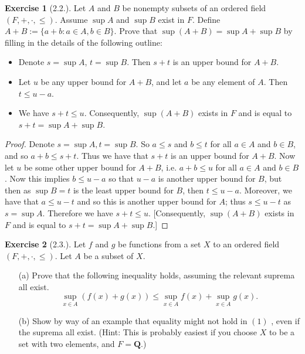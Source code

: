 \documentclass[9pt,reqno]{amsart}
\theoremstyle{definition}
\newtheorem{exercise}{Exercise}[section]
\newcommand{\qq}{\mathbf Q}
\begin{document}
\begin{exercise}[2.2.]
	Let $A$ and $B$ be nonempty subsets of an ordered field $(F, +, \cdot, \leq )$. Assume $\sup A$ and $\sup B$ exist in $F$. Define $A + B:=\{ a + b \colon a \in A, b \in B \}$. Prove that $\sup (A+B) = \sup A + \sup B$ by filling in the details of the following outline:
	\begin{itemize}
		\item Denote $s = \sup A$, $t= \sup B$. Then $s + t$ is an upper bound for $A+ B$. 
		\item Let $u$ be any upper bound for $A+B$, and let $a$ be any element of $A$. Then $t \leq u -a$.
		\item We have $s + t \leq u$. Consequently, $\sup (A+B)$ exists in $F$ and is equal to $s + t = \sup A + \sup B$.
	\end{itemize}
\begin{proof} Denote $s = \sup A, t = \sup B$. So $a \leq s$ and $b \leq t$ for all $a \in A$ and $b \in B$, and so $a+b \leq s + t$. Thus we have that $s + t$ is an upper bound for $A + B$. Now let $u$ be some other upper bound for $A+B$, i.e. $a+b \leq u$ for all $a \in A$ and $b \in B$. Now this implies $b \leq u -a$ so that $u-a$ is another upper bound for $B$, but then as $\sup B = t$ is the least upper bound for $B$, then $t \leq u-a$. Moreover, we have that $a \leq u-t$ and so this is another upper bound for $A$; thus $ s \leq u -t$ as $s = \sup A$. Therefore we have $s + t \leq u$. [Consequently, $\sup (A+B)$ exists in $F$ and is equal to $s + t = \sup A + \sup B$.]
\end{proof}
	
\end{exercise}
\begin{exercise}[2.3.]
Let $f$ and $g$ be functions from a set $X$ to an ordered field $(F, + , \cdot, \leq )$. Let $A$ be a subset of $X$.
\begin{itemize}
	\item [(a)] Prove that the following inequality holds, assuming the relevant suprema all exist.
\begin{equation}
	\sup_{x \in A} (f(x) + g(x)) \leq \sup_{x \in A} f(x) + \sup_{x \in A} g(x).
	\end{equation}
	\item[(b)]  Show by way of an example that equality might not hold in $(1)$ , even if the suprema all exist. (Hint: This is probably easiest if you choose $X$ to be a set with two elements, and $F = \qq$.)
\end{itemize}
\end{exercise}
\end{document}
